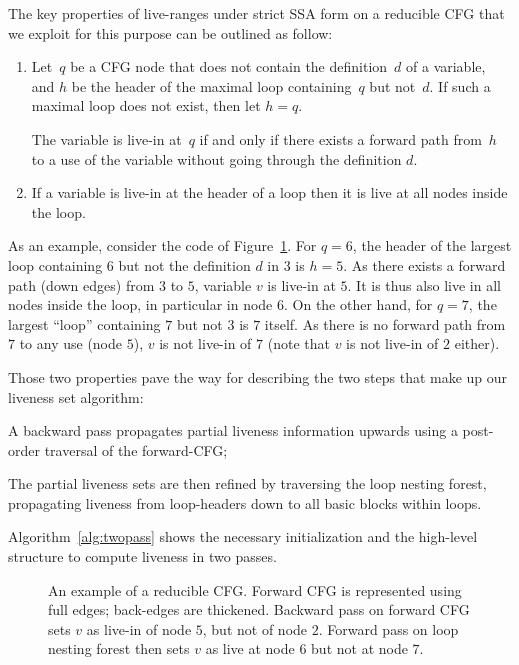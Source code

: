 The key properties of live-ranges under strict SSA form on a reducible CFG that 
we exploit for this purpose %
can be outlined as follow:
\begin{enumerate}
  \item
    Let~$q$ be a CFG node that does not contain the definition~$d$ of 
    a variable, and $h$ be the header of the maximal loop containing~$q$ 
    but not~$d$.
    If such a maximal loop does not exist, then let $h=q$.

    The variable is live-in at~$q$ if and only if there exists a forward path 
    from~$h$ to a use of the variable without going through the definition $d$.

  \item
    If a variable is live-in at the header of a loop then it is live at all 
    nodes inside the loop.
\end{enumerate}

As an example, consider the code of Figure~\ref{fig:examplecfg_run}. For $q=6$, the header of the largest loop containing $6$ but not the definition $d$ in $3$ is $h=5$. As there exists a forward path (down edges) from $3$ to $5$, variable $v$ is live-in at $5$. It is thus also live in all nodes inside the loop, in particular in node $6$. On the other hand, for $q=7$, the largest ``loop'' containing $7$ but not $3$ is $7$ itself. As there is no forward path from $7$ to any use (node $5$), $v$ is not live-in of $7$ (note that $v$ is not live-in of $2$ either).

Those two properties pave the way for describing the two steps that make up our liveness set algorithm:
\begin{compactenum}
\item
	A backward pass propagates partial liveness information upwards using a post-order traversal of the forward-CFG;
\item
	The partial liveness sets are then refined by traversing the loop nesting forest, propagating liveness from loop-headers down to all basic blocks within loops.
\end{compactenum}
Algorithm~\ref{alg:twopass} shows the necessary initialization and the high-level structure to compute liveness in two passes.

\begin{figure}[t]
   \begin{center}
       \caption{An example of a reducible CFG. Forward CFG is represented using 
       full edges; back-edges are thickened. Backward pass on forward CFG sets 
     $v$ as live-in of node $5$, but not of node $2$. Forward pass on loop 
   nesting forest then sets $v$ as live at node $6$ but not at node $7$. }
       \label{fig:examplecfg_run}
   \end{center}
\end{figure}

